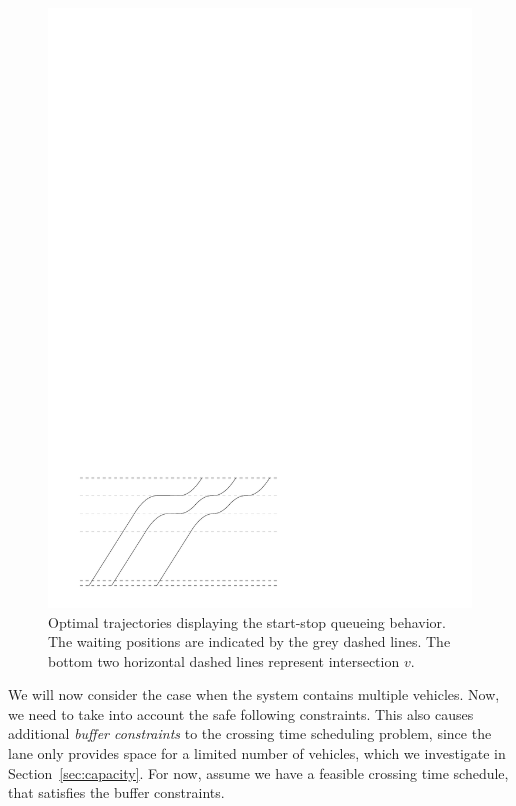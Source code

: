 \documentclass[a4paper]{article}
\theoremstyle{definition}
\theoremstyle{plain}
\begin{document}
\begin{figure}
  \centering
  \includegraphics[scale=1.0]{figures/motion/buffer}
  \caption{Optimal trajectories displaying the start-stop queueing behavior. The
    waiting positions are indicated by the grey dashed lines. The bottom two
    horizontal dashed lines represent intersection $v$.}
  \label{fig:buffering}
\end{figure}

We will now consider the case when the system contains multiple vehicles. Now,
we need to take into account the safe following constraints. This also causes
additional \textit{buffer constraints} to the crossing time scheduling problem,
since the lane only provides space for a limited number of vehicles, which we
investigate in Section~\ref{sec:capacity}. For now, assume we have a feasible
crossing time schedule, that satisfies the buffer constraints.
\end{document}
